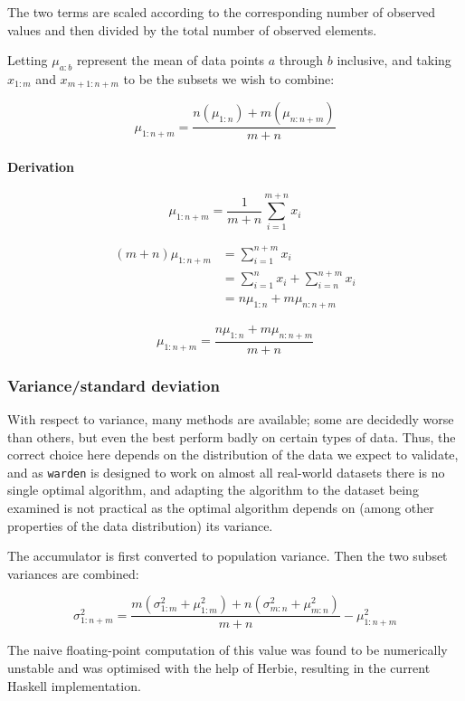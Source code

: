 \documentclass[a4paper]{article}
\begin{document}
The two terms are scaled according to the corresponding number of
observed values and then divided by the total number of observed
elements.

Letting \(\mu_{a:b}\) represent the mean of data points \(a\) through
\(b\) inclusive, and taking \(x_{1:m}\) and \(x_{m+1:n+m}\) to be the
subsets we wish to combine:

\[\mu_{1:n+m} = \frac{n(\mu_{1:n}) + m(\mu_{n:n+m})}{m + n}\]

\paragraph{Derivation}\label{derivation}

\[\mu_{1:n+m} = \frac{1}{m+n} \sum\limits_{i=1}^{m+n} x_i\]

\[\begin{aligned}(m + n) \mu_{1:n+m} &= \sum\limits_{i=1}^{n+m} x_i \\
                                     &= \sum\limits_{i=1}^n x_i + \sum\limits_{i=n}^{n+m} x_i \\
                                     &= n\mu_{1:n} + m\mu_{n:n+m}\end{aligned}\]

\[\mu_{1:n+m} = \frac{n\mu_{1:n} + m\mu_{n:n+m}}{m + n}\]

\subsubsection{Variance/standard
deviation}\label{variancestandard-deviation}

With respect to variance, many methods are available; some are decidedly
worse than others, but even the best perform badly on certain types of
data. Thus, the correct choice here depends on the distribution of the
data we expect to validate, and as \texttt{warden} is designed to work
on almost all real-world datasets there is no single optimal algorithm,
and adapting the algorithm to the dataset being examined is not
practical as the optimal algorithm depends on (among other properties of
the data distribution) its variance.\cite{Ling1974}

The accumulator is first converted to population variance. Then the two
subset variances are combined:

\[\sigma_{1:n+m}^2 = \frac{m(\sigma_{1:m}^2 + \mu_{1:m}^2) + n(\sigma_{m:n}^2 + \mu_{m:n}^2)}{m + n} - \mu_{1:n+m}^2\]

The naive floating-point computation of this value was found to be
numerically unstable and was optimised with the help of Herbie\cite{panchekha2015},
resulting in the current Haskell implementation.
\end{document}
